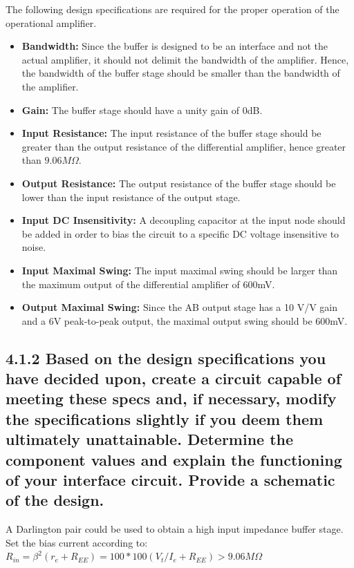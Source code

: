\documentclass[12pt]{article}
\begin{document}
The following design specifications are required for the proper operation of the operational amplifier.


\begin{itemize}
    \item \textbf{Bandwidth:} Since the buffer is designed to be an interface and not the actual amplifier, it should not delimit the bandwidth of the amplifier. 
    Hence, the bandwidth of the buffer stage should be smaller than the bandwidth of the amplifier. 
    \item \textbf{Gain:} The buffer stage should have a unity gain of 0dB.
    \item \textbf{Input Resistance:} The input resistance of the buffer stage should be greater than the output resistance of the differential amplifier, hence greater than $9.06M \Omega$.
    \item \textbf{Output Resistance:} The output resistance of the buffer stage should be lower than the input resistance of the output stage.
    \item \textbf{Input DC Insensitivity:} A decoupling capacitor at the input node should be added in order to bias the circuit to a specific DC voltage insensitive to noise.
    \item \textbf{Input Maximal Swing:} The input maximal swing should be larger than the maximum output of the differential amplifier of 600mV.
    \item \textbf{Output Maximal Swing:} Since the AB output stage has a 10 V/V gain and a 6V peak-to-peak output, the maximal output swing should be 600mV.
\end{itemize}

\subsection*{4.1.2 Based on the design specifications you have decided upon, create a circuit 
capable of meeting these specs and, if necessary, modify the specifications slightly if you deem 
them ultimately unattainable. Determine the component values and explain the functioning of your 
interface circuit. Provide a schematic of the design. }

A Darlington pair could be used to obtain a high input impedance buffer stage. \\

Set the bias current according to: \\

$R_{in} = \beta ^2 (r_e + R_{EE}) = 100 * 100 (V_t / I_e + R_{EE}) > 9.06M \Omega$ \\ 
\end{document}

